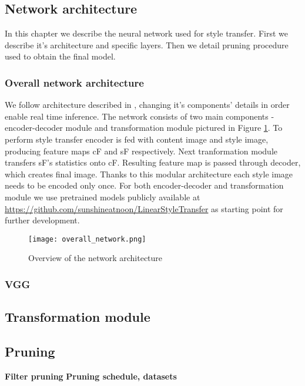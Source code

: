 \documentclass[../Main.tex]{subfiles}
\begin{document}
    
\subsection{Network architecture}
    In this chapter we describe the neural network used for style transfer. 
    First we describe it's architecture and specific layers. Then we detail
    pruning procedure used to obtain the final model.
    \subsubsection{Overall network architecture} 
    We follow architecture described in \cite{Li2018}, changing it's components' details 
    in order enable real time inference. The network consists of two 
    main components - encoder-decoder module and
    transformation module pictured in Figure \ref{fig:overall_network}.
    To perform style transfer encoder is fed with content image
    and style image, producing feature maps cF and sF respectively.
    Next tranformation module transfers sF's statistics onto cF. Resulting 
    feature map is passed through decoder, which creates final image. 
    Thanks to this modular architecture each style image needs to be encoded
    only once. For both encoder-decoder and
    transformation module we use pretrained models publicly available at 
    \url{https://github.com/sunshineatnoon/LinearStyleTransfer}
    as starting point for further development. 
    
    \begin{figure}[h!]
        \texttt{[image: overall\_network.png]}
        \caption{Overview of the network architecture}
        \label{fig:overall_network}
    \end{figure}
    
    
    \subsubsection{VGG} 
    \subsection{Transformation module}

\subsection{Pruning}
    \textbf{Filter pruning} 
    \textbf{Pruning schedule, datasets} 



\biblio %
\end{document}
